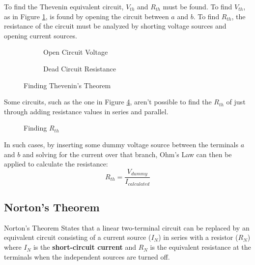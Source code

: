 \documentclass[12pt]{article}
\begin{document}
To find the Thevenin equivalent circuit, $V_{th}$ and $R_{th}$ must be found. To find $V_{th}$, as in Figure \ref{fig:040}, is found by opening the circuit between $a$ and $b$. To find $R_{th}$, the resistance of the circuit must be analyzed by shorting voltage sources and opening current sources.
\begin{figure}[H]
  \centering
  \begin{subfigure}[H]{0.45\textwidth}
    \centering
    
    \caption{Open Circuit Voltage}
    \label{fig:040}
  \end{subfigure}
  \begin{subfigure}[H]{0.45\textwidth}
    \centering
    
    \caption{Dead Circuit Resistance}
    \label{fig:041}
  \end{subfigure}
  \caption{Finding Thevenin's Theorem}
  \label{fig:theveninsTheorem}
\end{figure}
Some circuits, such as the one in Figure \ref{fig:044}, aren't possible to find the $R_{th}$ of just through adding resistance values in series and parallel.
\begin{figure}[H]
  \centering
  
  \caption{Finding $R_{th}$}
  \label{fig:044}
\end{figure}
In such cases, by inserting some dummy voltage source between the terminals $a$ and $b$ and solving for the current over that branch, Ohm's Law can then be applied to calculate the resistance:
\begin{equation*}
  R_{th} = \frac{V_{dummy}}{I_{calculated}}
\end{equation*}

\subsection{Norton's Theorem}
\label{ssec:nortonsTheorem}

\begin{definition}{Norton's Theorem}
  States that a linear two-terminal circuit can be replaced by an equivalent circuit consisting of a current source ($I_{N}$) in series with a resistor ($R_{N}$) where $I_{N}$ is the \textbf{short-circuit current} and $R_{N}$ is the equivalent resistance at the terminals when the independent sources are turned off.
\end{definition}
\end{document}
